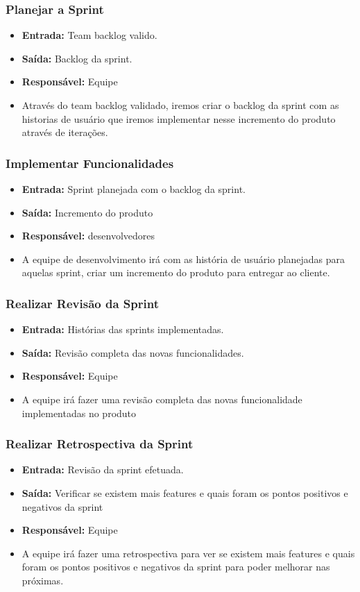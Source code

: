 \subsubsection{Planejar a Sprint}
  \begin{itemize}
    \item \textbf{Entrada:} Team backlog valido.
    \item \textbf{Saída:} Backlog da sprint.
    \item \textbf{Responsável:} Equipe
    \item Através do team backlog validado, iremos criar o backlog da sprint com as historias de usuário que iremos implementar nesse
      incremento do produto através de iterações.
  \end{itemize}

\subsubsection{Implementar Funcionalidades}
  \begin{itemize}
    \item \textbf{Entrada:} Sprint planejada com o backlog da sprint.
    \item \textbf{Saída:} Incremento do produto
    \item \textbf{Responsável:} desenvolvedores
    \item A equipe de desenvolvimento irá com as história de usuário planejadas para aquelas sprint, criar um incremento do produto
      para entregar ao cliente.
  \end{itemize}

\subsubsection{Realizar Revisão da Sprint}
  \begin{itemize}
    \item \textbf{Entrada:} Histórias das sprints implementadas.
    \item \textbf{Saída:} Revisão completa das novas funcionalidades.
    \item \textbf{Responsável:} Equipe
    \item A equipe irá fazer uma revisão completa das novas funcionalidade implementadas no produto
  \end{itemize}

\subsubsection{Realizar Retrospectiva da Sprint}
  \begin{itemize}
    \item \textbf{Entrada:} Revisão da sprint efetuada.
    \item \textbf{Saída:} Verificar se existem mais features e quais foram os pontos positivos e negativos da sprint
    \item \textbf{Responsável:} Equipe
    \item A equipe irá fazer uma retrospectiva para ver se existem mais features e quais foram os pontos positivos e negativos da
      sprint para poder melhorar nas próximas.
  \end{itemize}

